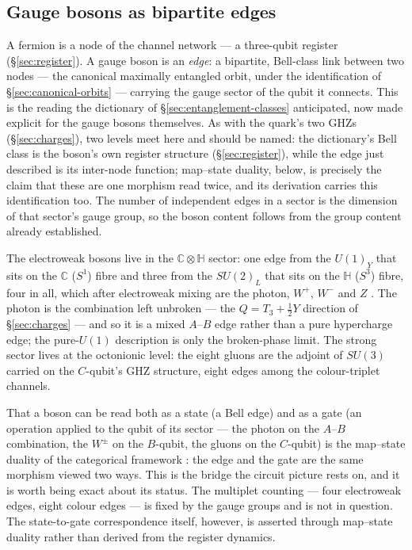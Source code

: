 \subsection{Gauge bosons as bipartite edges}

A fermion is a node of the channel network --- a three-qubit register (\S\ref{sec:register}). A gauge
boson is an \emph{edge}: a bipartite, Bell-class link between two nodes --- the canonical maximally
entangled orbit, under the identification of \S\ref{sec:canonical-orbits} --- carrying the gauge
sector of the qubit it connects. This is the reading the dictionary of \S\ref{sec:entanglement-classes}
anticipated, now made explicit for the gauge bosons themselves. As with the quark's two GHZs
(\S\ref{sec:charges}), two levels meet here and should be named: the dictionary's Bell class is
the boson's own register structure (\S\ref{sec:register}), while the edge just described is its
inter-node function; map--state duality, below, is precisely the claim that these are one morphism
read twice, and its derivation carries this identification too. The number of independent edges in a
sector is the dimension of that sector's gauge group, so the boson content follows from the group
content already established.

The electroweak bosons live in the $\mathbb{C}\otimes\mathbb{H}$ sector: one edge from the
$U(1)_Y$ that sits on the $\mathbb{C}$ ($S^1$) fibre and three from the $SU(2)_L$ that sits on the
$\mathbb{H}$ ($S^3$) fibre, four in all, which after electroweak mixing are the photon, $W^+$, $W^-$
and $Z$ \autocite{glashow1961partial,weinberg1967model,salam1968weak}. The photon is the combination
left unbroken --- the $Q = T_3 + \tfrac12 Y$ direction of \S\ref{sec:charges} --- and so it is a
mixed $A$--$B$ edge rather than a pure hypercharge edge; the pure-$U(1)$ description is only the
broken-phase limit. The strong sector lives at the octonionic level: the eight gluons are the adjoint
of $SU(3)$ carried on the $C$-qubit's GHZ structure, eight edges among the colour-triplet channels.

That a boson can be read both as a state (a Bell edge) and as a gate (an operation applied to the
qubit of its sector --- the photon on the $A$--$B$ combination, the $W^\pm$ on the $B$-qubit, the
gluons on the $C$-qubit) is the map--state duality of the categorical framework
\autocite{coeckekissinger2010compositional}: the edge and the gate are the same morphism viewed two
ways. This is the bridge the circuit picture rests on, and it is worth being exact about its status.
The multiplet counting --- four electroweak edges, eight colour edges --- is fixed by the gauge
groups and is not in question. The state-to-gate correspondence itself, however, is asserted through
map--state duality rather than derived from the register dynamics.

